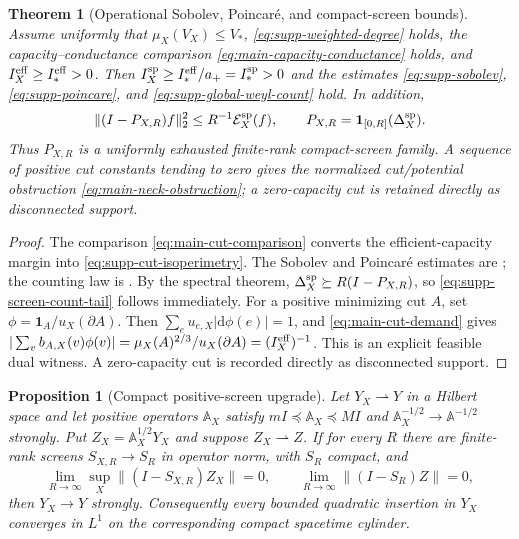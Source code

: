 \documentclass[11pt]{article}
\newtheorem{theorem}{Theorem}[section]
\numberwithin{equation}{section}
\newtheorem{proposition}[proposition]{Proposition}
\theoremstyle{definition}
\theoremstyle{remark}
\newcommand{\one}{\mathbf 1}
\newcommand{\dd}{\mathrm d}
\begin{document}
\begin{theorem}[Operational Sobolev, Poincar\'e, and compact-screen bounds]
\label{thm:supp-spatial-screen}
Assume uniformly that $\mu_X(V_X)\le V_*$,
\eqref{eq:supp-weighted-degree} holds, the capacity--conductance comparison
\eqref{eq:main-capacity-conductance} holds, and
$I_X^{\rm eff}\ge I_*^{\rm eff}>0$.  Then
$I_X^{\rm sp}\ge I_*^{\rm eff}/a_+=I_*^{\rm sp}>0$ and the estimates
\eqref{eq:supp-sobolev}, \eqref{eq:supp-poincare}, and
\eqref{eq:supp-global-weyl-count} hold.  In addition,
\begin{equation}
 \|(I-P_{X,R})f\|_2^2
 \le R^{-1}\mathcal E_X^{\rm sp}(f),
 \qquad P_{X,R}=\one_{[0,R]}(\Delta_X^{\rm sp}).
 \label{eq:supp-screen-count-tail}
\end{equation}
Thus $P_{X,R}$ is a uniformly exhausted finite-rank compact-screen family.
A sequence of positive cut constants tending to zero gives the normalized
cut/potential obstruction \eqref{eq:main-neck-obstruction}; a zero-capacity
cut is retained directly as disconnected support.
\end{theorem}

\begin{proof}
The comparison \eqref{eq:main-cut-comparison} converts the efficient-capacity
margin into \eqref{eq:supp-cut-isoperimetry}.  The Sobolev and Poincar\'e
estimates are ; the counting law is
.  By the spectral theorem,
$\Delta_X^{\rm sp}\succeq R(I-P_{X,R})$, so
\eqref{eq:supp-screen-count-tail} follows immediately.  For a positive minimizing cut $A$, set
$\phi=\one_A/u_X(\partial A)$.  Then
$\sum_eu_{e,X}|\dd\phi(e)|=1$, and \eqref{eq:main-cut-demand} gives
$|\sum_vb_{A,X}(v)\phi(v)|=\mu_X(A)^{2/3}/u_X(\partial A)
=(I_X^{\rm eff})^{-1}$.  This is an explicit feasible dual witness.
A zero-capacity cut is recorded directly as disconnected support.
\end{proof}

\begin{proposition}[Compact positive-screen upgrade]
\label{prop:supp-compact-upgrade}
Let $Y_X\rightharpoonup Y$ in a Hilbert space and let positive operators
$\mathbb A_X$ satisfy
$mI\preceq\mathbb A_X\preceq MI$ and
$\mathbb A_X^{-1/2}\to\mathbb A^{-1/2}$ strongly.  Put
$Z_X=\mathbb A_X^{1/2}Y_X$ and suppose $Z_X\rightharpoonup Z$.  If for every
$R$ there are finite-rank screens $S_{X,R}\to S_R$ in operator norm, with
$S_R$ compact, and
\[
 \lim_{R\to\infty}\sup_X\|(I-S_{X,R})Z_X\|=0,
 \qquad
 \lim_{R\to\infty}\|(I-S_R)Z\|=0,
\]
then $Y_X\to Y$ strongly.  Consequently every bounded quadratic insertion in
$Y_X$ converges in $L^1$ on the corresponding compact spacetime cylinder.
\end{proposition}
\end{document}

